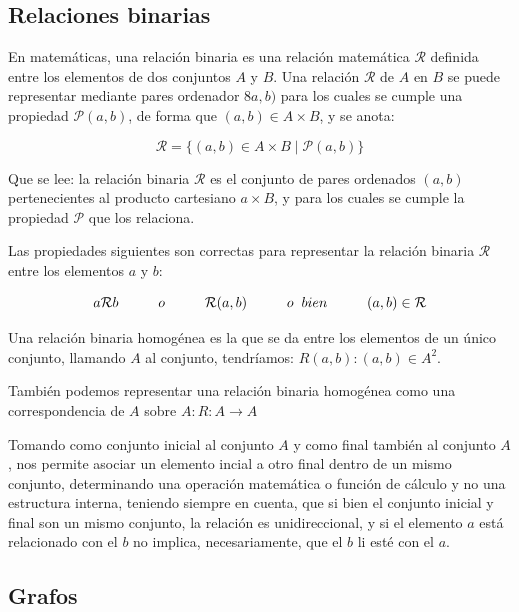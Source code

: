 \subsection{Relaciones binarias}

En matemáticas, una relación binaria es una relación matemática $\mathcal{R}$ definida entre los elementos de dos conjuntos $A$ y $B$. Una relación $\mathcal{R}$ de $A$ en $B$ se puede representar mediante pares ordenador $8a,b)$ para los cuales se cumple una propiedad $\mathcal{P}(a,b)$, de forma que $(a,b) \in A\times B$, y se anota:

$$
\mathcal{R} = \{(a,b) \in A\times B  \mid   \mathcal{P}(a,b)\}
$$

Que se lee: la relación binaria $\mathcal{R}$ es el conjunto de pares ordenados $(a,b)$ pertenecientes al producto cartesiano $a\times B$, y para los cuales se cumple la propiedad $\mathcal{P}$ que los relaciona.

Las propiedades siguientes son correctas para representar la relación binaria $\mathcal{R}$ entre los elementos $a$ y $b$:

$$
a\mathcal{R}b \hspace{1cm} o \hspace{1cm}\mathcal{R}(a,b)\hspace{1cm} o\hspace{0.2cm}bien\hspace{1cm}(a,b) \in \mathcal{R}
$$

Una relación binaria homogénea es la que se da entre los elementos de un único conjunto, llamando $A$ al conjunto, tendríamos: $R(a,b) : (a,b) \in A^2$.

También podemos representar una relación binaria homogénea como una correspondencia de $A$ sobre $A: R: A \rightarrow A$

Tomando como conjunto inicial al conjunto $A$ y como final también al conjunto $A$, nos permite asociar un elemento incial a otro final dentro de un mismo conjunto, determinando una operación matemática o función de cálculo y no una estructura interna, teniendo siempre en cuenta, que si bien el conjunto inicial y final son un mismo conjunto, la relación es unidireccional, y si el elemento $a$ está relacionado con el $b$ no implica, necesariamente, que el $b$ li esté con el $a$.


\subsection{Grafos}

